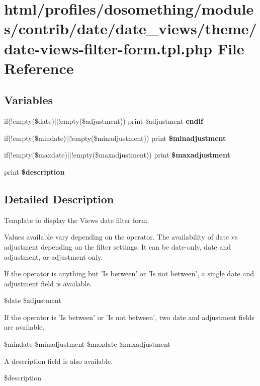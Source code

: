 \hypertarget{date-views-filter-form_8tpl_8php}{
\section{html/profiles/dosomething/modules/contrib/date/date\_\-views/theme/date-\/views-\/filter-\/form.tpl.php File Reference}
\label{date-views-filter-form_8tpl_8php}
}
\subsection*{Variables}
\begin{DoxyCompactItemize}
\item 
\hypertarget{date-views-filter-form_8tpl_8php_a82cd33ca97ff99f2fcc5e9c81d65251b}{
if(!empty(\$date)$|$$|$!empty(\$adjustment)) print \$adjustment {\bfseries endif}}
\label{date-views-filter-form_8tpl_8php_a82cd33ca97ff99f2fcc5e9c81d65251b}

\item 
\hypertarget{date-views-filter-form_8tpl_8php_ad3aea6ae121c0ba4337ef56eb776a9b2}{
if(!empty(\$mindate)$|$$|$!empty(\$minadjustment)) print {\bfseries \$minadjustment}}
\label{date-views-filter-form_8tpl_8php_ad3aea6ae121c0ba4337ef56eb776a9b2}

\item 
\hypertarget{date-views-filter-form_8tpl_8php_a36e4c8eaad68eca02d8e5384109c47c0}{
if(!empty(\$maxdate)$|$$|$!empty(\$maxadjustment)) print {\bfseries \$maxadjustment}}
\label{date-views-filter-form_8tpl_8php_a36e4c8eaad68eca02d8e5384109c47c0}

\item 
\hypertarget{date-views-filter-form_8tpl_8php_a6f52c29993b17bf2650a9337fb56d41d}{
print {\bfseries \$description}}
\label{date-views-filter-form_8tpl_8php_a6f52c29993b17bf2650a9337fb56d41d}

\end{DoxyCompactItemize}


\subsection{Detailed Description}
Template to display the Views date filter form.

Values available vary depending on the operator. The availability of date vs adjustment depending on the filter settings. It can be date-\/only, date and adjustment, or adjustment only.

If the operator is anything but 'Is between' or 'Is not between', a single date and adjustment field is available.

\$date \$adjustment

If the operator is 'Is between' or 'Is not between', two date and adjustment fields are available.

\$mindate \$minadjustment \$maxdate \$maxadjustment

A description field is also available.

\$description 